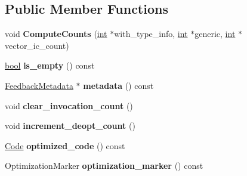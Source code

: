 \subsection*{Public Member Functions}
\begin{DoxyCompactItemize}
\item 
\mbox{\label{classv8_1_1internal_1_1FeedbackVector_a494d8db442e09378f5526b7be1fa7d54}} 
void {\bfseries Compute\+Counts} (\mbox{\hyperlink{classint}{int}} $\ast$with\+\_\+type\+\_\+info, \mbox{\hyperlink{classint}{int}} $\ast$generic, \mbox{\hyperlink{classint}{int}} $\ast$vector\+\_\+ic\+\_\+count)
\item 
\mbox{\label{classv8_1_1internal_1_1FeedbackVector_a692825685d500241f64622ee06c82cc0}} 
\mbox{\hyperlink{classbool}{bool}} {\bfseries is\+\_\+empty} () const
\item 
\mbox{\label{classv8_1_1internal_1_1FeedbackVector_af60b9e0d6f27e5c812c88d8c76b5767f}} 
\mbox{\hyperlink{classv8_1_1internal_1_1FeedbackMetadata}{Feedback\+Metadata}} $\ast$ {\bfseries metadata} () const
\item 
\mbox{\label{classv8_1_1internal_1_1FeedbackVector_a6d807f938b1931ac2f521e80a6069457}} 
void {\bfseries clear\+\_\+invocation\+\_\+count} ()
\item 
\mbox{\label{classv8_1_1internal_1_1FeedbackVector_a409860d7ce80c8930d01e37dc8450965}} 
void {\bfseries increment\+\_\+deopt\+\_\+count} ()
\item 
\mbox{\label{classv8_1_1internal_1_1FeedbackVector_ae05f0fe6e4c8479bcff89a9717b85092}} 
\mbox{\hyperlink{classv8_1_1internal_1_1Code}{Code}} {\bfseries optimized\+\_\+code} () const
\item 
\mbox{\label{classv8_1_1internal_1_1FeedbackVector_afa675d11c92c8e0a1abeb28549688fc6}} 
Optimization\+Marker {\bfseries optimization\+\_\+marker} () const
\item 
\mbox{\label{classv8_1_1internal_1_1FeedbackVector_a3092075d611274edd9d4f34630f899be}} 

\end{DoxyCompactItemize}
